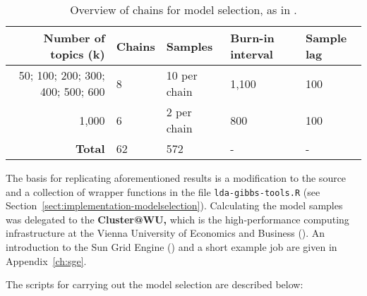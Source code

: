 \begin{table}[htbp] \footnotesize %
\begin{center}
\begin{tabular}{rllll}
  \toprule
  \textbf{Number of topics (k)} & \textbf{Chains} & \textbf{Samples} & \textbf{Burn-in interval}& \textbf{Sample lag}\\
  \midrule
  50; 100; 200; 300; 400; 500; 600 & 8 & 10 per chain& 1,100 & 100 \\
  1,000 & 6 & 2 per chain & 800 & 100 \\
  \midrule
  \textbf{Total} & 62 & 572 & - & - \\
  \bottomrule
\end{tabular}
\caption{Overview of chains for model selection, as in .}
\label{tbl:modelselection-chains}
\end{center}
\end{table}

The basis for replicating aforementioned results is a modification to the  source and a collection of wrapper functions in the file \texttt{lda-gibbs-tools.R} (see Section~\ref{sect:implementation-modelselection}). Calculating the model samples was delegated to the \textbf{Cluster@WU,} which is the high-performance computing infrastructure at the Vienna University of Economics and Business (). An introduction to the Sun Grid Engine () and a short example job are given in Appendix~\ref{ch:sge}.

The scripts for carrying out the model selection are described below:

